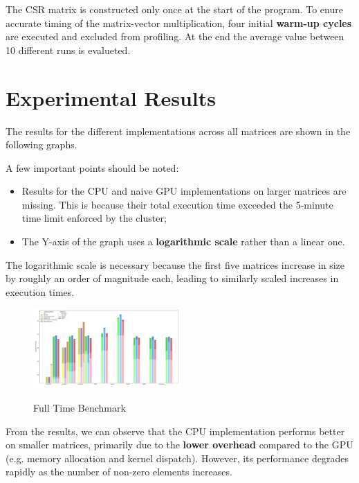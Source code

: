 \documentclass[conference]{IEEEtran}
\begin{document}
        The CSR matrix is constructed only once at the start of the program.
        To enure accurate timing of the matrix-vector multiplication, four
        initial \textbf{warm-up cycles} are executed and excluded from
        profiling.
        At the end the average value between 10 different runs is evalueted.

    \section{Experimental Results}

    The results for the different implementations across all matrices are shown
    in the following graphs.

    A few important points should be noted:
    \begin{itemize}
        \item Results for the CPU and naive GPU implementations on larger
            matrices are missing.
            This is because their total execution time exceeded the 5-minute
            time limit enforced by the cluster;
        \item The Y-axis of the graph uses a \textbf{logarithmic scale} rather
            than a linear one.
    \end{itemize}

    The logarithmic scale is necessary because the first five matrices increase
    in size by roughly an order of magnitude each, leading to similarly scaled
    increases in execution times.

    \begin{figure}[ht]
        \caption{Full Time Benchmark}
        \centering
        \includegraphics[width=0.5\textwidth]{full-benchmark.png}
        \label{fig:full-benchmark}
    \end{figure}

    From the results, we can observe that the CPU implementation performs
    better on smaller matrices, primarily due to the \textbf{lower overhead}
    compared to the GPU (e.g. memory allocation and kernel dispatch).
    However, its performance degrades rapidly as the number of non-zero
    elements increases.
\end{document}
